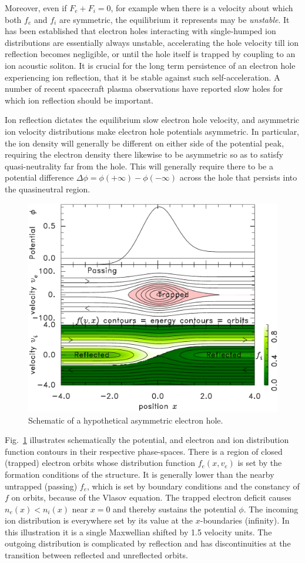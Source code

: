 \documentclass[pre]{revtex4-2}
\begin{document}
Moreover, even if $F_e+F_i=0$, for example when there is a velocity
about which both $f_e$ and $f_i$ are symmetric, the equilibrium it
represents may be \emph{unstable}. It has been
established\cite{Hutchinson2021c} that electron holes interacting with
single-humped ion distributions are essentially always
unstable\cite{Eliasson2004}, accelerating the hole velocity till ion
reflection becomes negligible\cite{Zhou2016}, or until the hole itself
is trapped by coupling to an ion acoustic
soliton\cite{Saeki1998,Zhou2017}. It is crucial for the long term
persistence of an electron hole experiencing ion reflection, that it
be stable against such self-acceleration. A number of recent
spacecraft plasma observations have reported slow holes for which ion
reflection should be important\cite{Graham2016,Steinvall2019,Lotekar2020,Kamaletdinov2021}.

Ion reflection dictates the equilibrium slow electron hole velocity,
and asymmetric ion velocity distributions make electron hole
potentials asymmetric. In particular, the ion density will generally
be different on either side of the potential peak, requiring the
electron density there likewise to be asymmetric so as to satisfy
quasi-neutrality far from the hole. This will generally require there
to be a potential difference $\Delta \phi=\phi(+\infty)-\phi(-\infty)$
across the hole that persists into the quasineutral region.

\begin{figure}[htp]
  \centering
  \includegraphics[width=0.6\hsize]{electronholeorbits}
  \caption{Schematic of a hypothetical asymmetric electron hole.}
  \label{fig:electronholeorbits}
\end{figure}
Fig.\ \ref{fig:electronholeorbits} illustrates schematically the
potential, and electron and ion distribution function contours in
their respective phase-spaces. There is a region of closed (trapped)
electron orbits whose distribution function $f_e(x,v_e)$ is set by the
formation conditions of the structure. It is generally lower than the
nearby untrapped (passing) $f_e$, which is set by boundary conditions
and the constancy of $f$ on orbits, because of the Vlasov
equation. The trapped electron deficit causes $n_e(x)<n_i(x)$ near
$x=0$ and thereby sustains the potential $\phi$. The incoming ion
distribution is everywhere set by its value at the $x$-boundaries
(infinity). In this illustration it is a single Maxwellian shifted by
1.5 velocity units. The outgoing distribution is complicated by
reflection and has discontinuities at the transition between reflected
and unreflected orbits.
\end{document}
